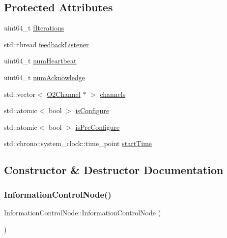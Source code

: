 \subsection*{Protected Attributes}
\begin{DoxyCompactItemize}
\item 
uint64\+\_\+t \hyperlink{classInformationControlNode_a8e938831ffc590e95ed975381943e595}{f\+Iterations}
\item 
std\+::thread \hyperlink{classInformationControlNode_a82ef0c95e5b897790498d5f475dd6d0b}{feedback\+Listener}
\item 
uint64\+\_\+t \hyperlink{classInformationControlNode_a3530b78061cb560aeba900be9718955c}{num\+Heartbeat}
\item 
uint64\+\_\+t \hyperlink{classInformationControlNode_a75312338ceffe68bb7e5904597415cc9}{num\+Acknowledge}
\item 
std\+::vector$<$ \hyperlink{structO2Channel}{O2\+Channel} $\ast$ $>$ \hyperlink{classInformationControlNode_aa7faa99adf4a126664616a28b04d312e}{channels}
\item 
std\+::atomic$<$ bool $>$ \hyperlink{classInformationControlNode_aada0db0ae61f7fa74e5029a2bfbd5e7f}{is\+Configure}
\item 
std\+::atomic$<$ bool $>$ \hyperlink{classInformationControlNode_a4a20b78d45ee5cb7ac1e3c81446a70f2}{is\+Pre\+Configure}
\item 
std\+::chrono\+::system\+\_\+clock\+::time\+\_\+point \hyperlink{classInformationControlNode_a181a99bf688ac3a0702265626c2fa40d}{start\+Time}
\end{DoxyCompactItemize}


\subsection{Constructor \& Destructor Documentation}
\mbox{\label{classInformationControlNode_a9baee017a043808500bb4b13cde14472}} 
\subsubsection{\texorpdfstring{Information\+Control\+Node()}{InformationControlNode()}}
{\footnotesize\ttfamily Information\+Control\+Node\+::\+Information\+Control\+Node (\begin{DoxyParamCaption}{ }\end{DoxyParamCaption})}

